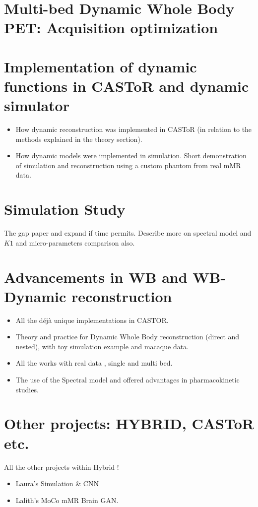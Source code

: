 

\chapter{Multi-bed Dynamic Whole Body PET: Acquisition optimization}


\chapter{Implementation of dynamic functions in CASToR and dynamic simulator}

\begin{itemize}
    \item  How dynamic reconstruction was implemented in CASToR (in relation to the methods explained in the theory section). \\
    \item  How dynamic models were implemented in simulation. Short demonstration of simulation and reconstruction using a custom phantom from real mMR data.  \\
\end{itemize}

\chapter{Simulation Study}
The gap paper and expand if time permits. Describe more on spectral model and $K1$ and micro-parameters comparison also. \\

\chapter{Advancements in WB and WB-Dynamic reconstruction}
\label{chap:Results_CASToR}
\begin{itemize}
\item  All the déjà unique implementations in CASTOR. \\
\item  Theory and practice for Dynamic Whole Body reconstruction (direct and nested), with toy simulation example and macaque data. \\
    \item All the works with real data , single and multi bed.  \\ 
    \item The use of the Spectral model and offered advantages in pharmacokinetic studies. \\
\end{itemize}

\chapter{Other projects: HYBRID, CASToR etc.}
All the other projects within Hybrid ! \\
\begin{itemize}
    \item Laura's Simulation \& CNN \\
    \item Lalith's MoCo mMR Brain GAN. \\
\end{itemize}

